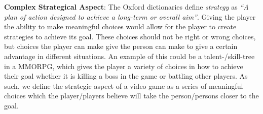 \textbf{Complex Strategical Aspect}: The Oxford dictionaries define \textit{strategy} as \textit{``A plan of action designed to achieve a long-term or overall aim''}.\cite{strategyOx}
Giving the player the ability to make meaningful choices would allow for the player to create strategies to achieve its goal.
These choices should not be right or wrong choices, but choices the player can make give the person can make to give a certain advantage in different situations.
An example of this could be a talent-/skill-tree in a MMORPG, which gives the player a variety of choices in how to achieve their goal whether it is killing a boss in the game or battling other players.
As such, we define the strategic aspect of a video game as a series of meaningful choices which the player/players believe will take the person/persons closer to the goal.
